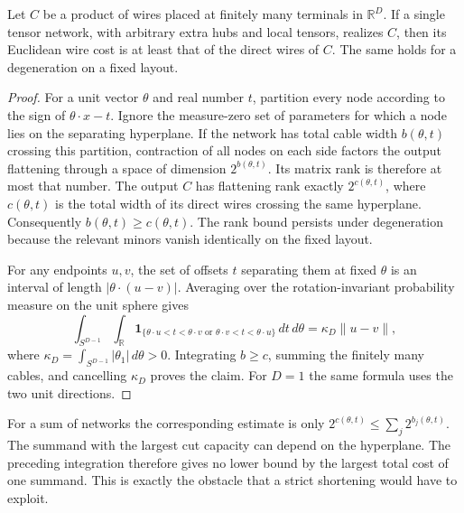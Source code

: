 \begin{proposition}\label{prop:single-layout}
Let $C$ be a product of wires placed at finitely many terminals in $\mathbb R^D$. If a single tensor network, with arbitrary extra hubs and local tensors, realizes $C$, then its Euclidean wire cost is at least that of the direct wires of $C$. The same holds for a degeneration on a fixed layout.
\end{proposition}
\begin{proof}
For a unit vector $\theta$ and real number $t$, partition every node according to the sign of $\theta\cdot x-t$. Ignore the measure-zero set of parameters for which a node lies on the separating hyperplane. If the network has total cable width $b(\theta,t)$ crossing this partition, contraction of all nodes on each side factors the output flattening through a space of dimension $2^{b(\theta,t)}$. Its matrix rank is therefore at most that number. The output $C$ has flattening rank exactly $2^{c(\theta,t)}$, where $c(\theta,t)$ is the total width of its direct wires crossing the same hyperplane. Consequently $b(\theta,t)\geq c(\theta,t)$. The rank bound persists under degeneration because the relevant minors vanish identically on the fixed layout.

For any endpoints $u,v$, the set of offsets $t$ separating them at fixed $\theta$ is an interval of length $|\theta\cdot(u-v)|$. Averaging over the rotation-invariant probability measure on the unit sphere gives
\[
 \int_{S^{D-1}}\int_{\mathbb R}
 \mathbf1_{\{\theta\cdot u<t<\theta\cdot v\text{ or }\theta\cdot v<t<\theta\cdot u\}}
 \,dt\,d\theta=\kappa_D\|u-v\|,
\]
where $\kappa_D=\int_{S^{D-1}}|\theta_1|\,d\theta>0$. Integrating $b\geq c$, summing the finitely many cables, and cancelling $\kappa_D$ proves the claim. For $D=1$ the same formula uses the two unit directions.
\end{proof}

For a sum of networks the corresponding estimate is only
$2^{c(\theta,t)}\leq\sum_j2^{b_j(\theta,t)}$. The summand with the largest cut capacity can depend on the hyperplane. The preceding integration therefore gives no lower bound by the largest total cost of one summand. This is exactly the obstacle that a strict shortening would have to exploit.

